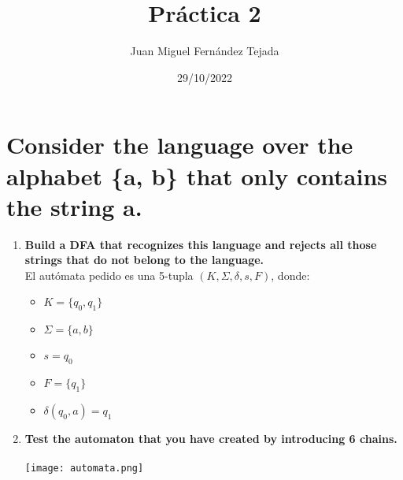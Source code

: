 \documentclass[11pt]{article}
\title{\textbf{Práctica 2}}
\author{Juan Miguel Fernández Tejada}
\date{29/10/2022}
\begin{document}
\maketitle
\thispagestyle{empty}

\section{Consider the language over the alphabet \{a, b\} that only contains the string a.}

\begin{enumerate}
\item \textbf{Build a DFA that recognizes this language and rejects all those strings that do not belong to the language.}\\
El autómata pedido es una 5-tupla $(K, \Sigma, \delta, s, F)$, donde:
\begin{itemize}
\item $K = \{q_0, q_1\}$
\item $\Sigma = \{a, b\}$
\item $s = q_0$
\item $F = \{q_1\}$
\item $\delta(q_0, a) = q_1$
\end{itemize}
\item \textbf{Test the automaton that you have created by introducing 6 chains.}\\\\
\texttt{[image: automata.png]}
\end{enumerate}
\end{document}
